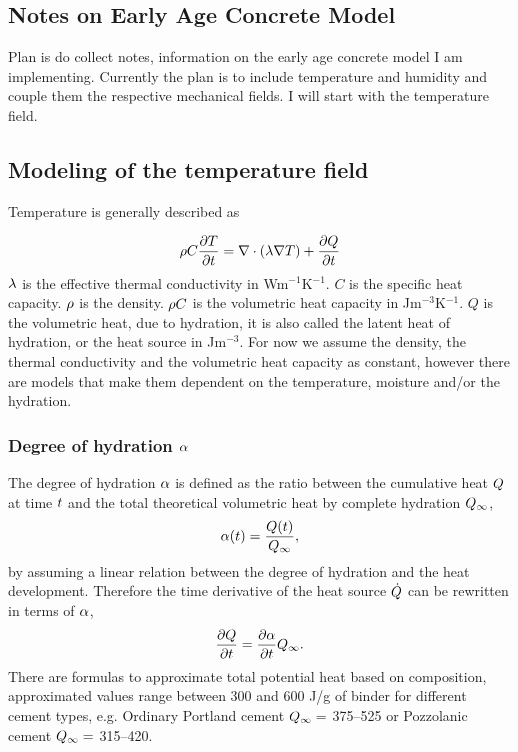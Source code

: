 
\subsection{Notes on Early Age Concrete Model}
Plan is do collect notes, information on the early age concrete model I am implementing.
Currently the plan is to include temperature and humidity and couple them the respective mechanical fields.
I will start with the temperature field.

\subsection{Modeling of the temperature field}
Temperature is generally described as

\begin{align}
	\rho C \frac{\partial T}{\partial t} = \nabla \cdot (\lambda \nabla T) + \frac{\partial Q}{\partial t} \label{eq:heat1}
\end{align}
$\lambda$ is the effective thermal conductivity in Wm$^{-1}$K$^{-1}$.
$C$ is the specific heat capacity.
$\rho$ is the density.
$\rho C$ is the volumetric heat capacity in Jm$^{-3}$K$^{-1}$.
$Q$ is the volumetric heat, due to hydration, it is also called the latent heat of hydration, or the heat source in Jm$^{-3}$.
For now we assume the density, the thermal conductivity and the volumetric heat capacity as constant, however there are models that make them dependent on the temperature, moisture and/or the hydration.


\subsubsection{Degree of hydration $\alpha$}
The degree of hydration $\alpha$ is defined as the ratio between the cumulative heat $Q$ at time $t$ and the total theoretical volumetric heat by complete hydration $Q_{\infty}$,
\begin{align}
	\alpha(t) = \frac{Q(t)}{Q_{\infty}},
\end{align}
by assuming a linear relation between the degree of hydration and the heat development.
Therefore the time derivative of the heat source $\dot{Q}$ can be rewritten in terms of $\alpha$, 
\begin{align}
	\frac{\partial Q}{\partial t} = \frac{\partial \alpha}{\partial t} Q_{\infty}. \label{eq:qdotalphadot}
\end{align}
There are formulas to approximate total potential heat based on composition, approximated values range between 300 and 600 J/g of binder for different cement types, e.g. Ordinary Portland cement $Q_{\infty} =$ 375–525 or Pozzolanic cement $Q_{\infty} =$ 315–420.  


